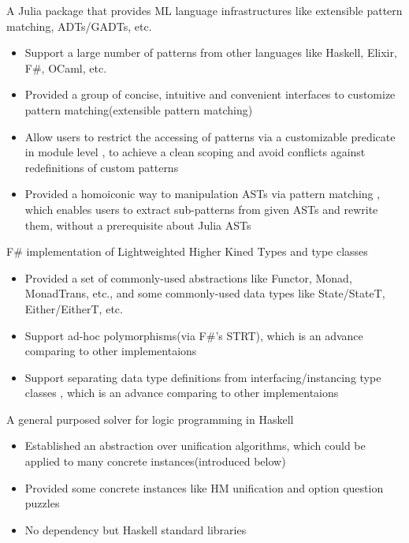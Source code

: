 \documentclass{resume}
\begin{document}
A Julia package that provides ML language infrastructures like extensible pattern matching, ADTs/GADTs, etc.
\begin{itemize}
  \item Support a large number of patterns from other languages like Haskell, Elixir, F\#, OCaml, etc.
  \item Provided a group of concise, intuitive and convenient interfaces to customize pattern matching(extensible pattern matching)
  \item Allow users to restrict the accessing of patterns via a customizable predicate in module level 
        , to achieve a clean scoping and avoid conflicts against redefinitions of custom patterns
  \item Provided a homoiconic way to manipulation ASTs via pattern matching 
        , which enables users to extract sub-patterns from given ASTs and rewrite them, without a prerequisite
  about Julia ASTs
\end{itemize}

F\# implementation of Lightweighted Higher Kined Types and type classes
\begin{itemize}
 \item Provided a set of commonly-used abstractions like Functor, Monad, MonadTrans, etc., and some commonly-used data types like State/StateT, Either/EitherT, etc.
 \item Support ad-hoc polymorphisms(via F\#'s STRT), which is an advance comparing to other implementaions
 \item Support separating data type definitions from interfacing/instancing type classes , which is an advance comparing to other implementaions
\end{itemize}

A general purposed solver for logic programming in Haskell
\begin{itemize}
 \item Established an abstraction over unification algorithms, which could be applied to many concrete instances(introduced below)
 \item Provided some concrete instances like HM unification and option question puzzles
 \item No dependency but Haskell standard libraries
\end{itemize}
\end{document}
